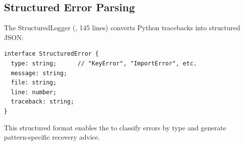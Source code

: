 \subsection{Structured Error Parsing}

The StructuredLogger (, 145 lines) converts Python tracebacks into structured JSON:

\begin{lstlisting}[style=typescript, caption=Structured error output format.]
interface StructuredError {
  type: string;      // "KeyError", "ImportError", etc.
  message: string;
  file: string;
  line: number;
  traceback: string;
}
\end{lstlisting}

This structured format enables the \governor to classify errors by type and generate pattern-specific recovery advice.
